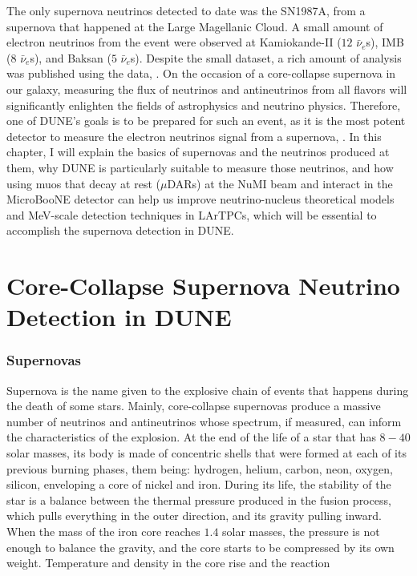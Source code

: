 The only supernova neutrinos detected to date was the SN1987A, from a supernova that happened at the Large Magellanic Cloud. A small amount of electron neutrinos from the event were observed at Kamiokande-II ($12$ $\bar{\nu}_e$s), IMB ($8$ $\bar{\nu}_e$s), and Baksan ($5$ $\bar{\nu}_e$s). Despite the small dataset, a rich amount of analysis was published using the data, \cite{Kamiokande-II-PRL, Kamiokande-II-PRD, IMB, Baksan}. 
On the occasion of a core-collapse supernova in our galaxy, measuring the flux of neutrinos and antineutrinos from all flavors will significantly enlighten the fields of astrophysics and neutrino physics. Therefore, one of DUNE's goals is to be prepared for such an event, as it is the most potent detector to measure the electron neutrinos signal from a supernova, \cite{dune_SAND}.
In this chapter, I will explain the basics of supernovas and the neutrinos produced at them, why DUNE is particularly suitable to measure those neutrinos, and how using muos that decay at rest ($\mu$DARs) at the NuMI beam and interact in the MicroBooNE detector can help us improve neutrino-nucleus theoretical models and MeV-scale detection techniques in LArTPCs, which will be essential to accomplish the supernova detection in DUNE.

\section{Core-Collapse Supernova Neutrino Detection in DUNE}
\subsubsection{Supernovas}
Supernova is the name given to the explosive chain of events that happens during the death of some stars. Mainly, core-collapse supernovas produce a massive number of neutrinos and antineutrinos whose spectrum, if measured, can inform the characteristics of the explosion. 
At the end of the life of a star that has $8-40$ solar masses, its body is made of concentric shells that were formed at each of its previous burning phases, them being: hydrogen, helium, carbon, neon, oxygen, silicon, enveloping a core of nickel and iron. During its life, the stability of the star is a balance between the thermal pressure produced in the fusion process, which pulls everything in the outer direction, and its gravity pulling inward. When the mass of the iron core reaches $1.4$ solar masses, the pressure is not enough to balance the gravity, and the core starts to be compressed by its own weight. Temperature and density in the core rise and the reaction

